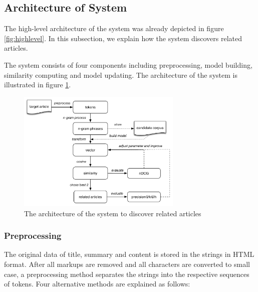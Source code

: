 \begin{description}
\label{tab:def_terms}
\end{description}

\bigbreak

\subsection{Architecture of System}
\label{sec:4.3}

The high-level architecture of the system was already depicted in figure \ref{fig:highlevel}. In this subsection, we explain how the system discovers related articles. 

The system consists of four components including preprocessing, model building, similarity computing and model updating. The architecture of the system is illustrated in figure \ref{fig:unsupervised}. 

\begin{figure}[!htb]
    \centering
    \includegraphics[width=0.7\textwidth]{fig/unsupervise}
    \caption{The architecture of the system to discover related articles}
    \label{fig:unsupervised}
\end{figure}

\subsubsection{Preprocessing}
The original data of title, summary and content is stored in the strings in HTML format. After all markups are removed and all characters are converted to small case, a preprocessing method separates the strings into the respective sequences of tokens. Four alternative methods are explained as follows:

